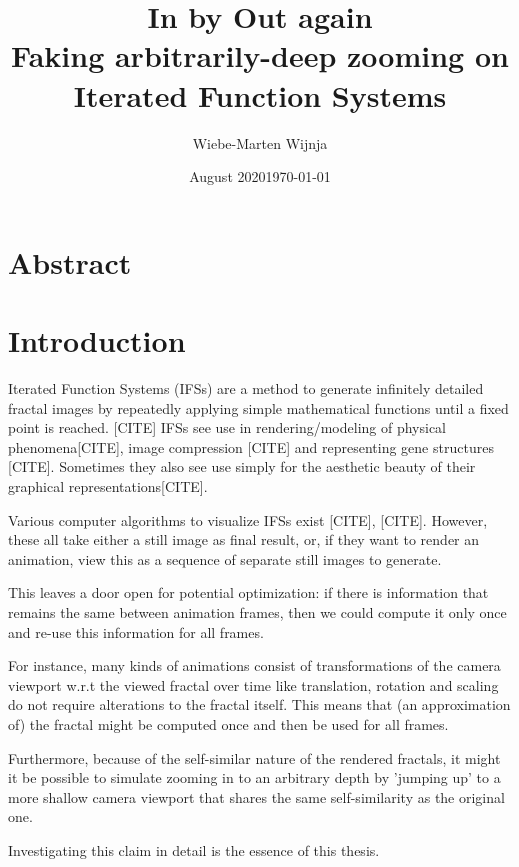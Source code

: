 \documentclass[11pt]{article}
\date{August 2020}
\author{Wiebe-Marten Wijnja}
\date{\today}
\title{\Huge In by Out again\\\medskip
\large Faking arbitrarily-deep zooming on Iterated Function Systems}
\begin{document}
\maketitle
\setcounter{tocdepth}{4}
\tableofcontents

\listoftodos


\section{Abstract}
\label{sec:org6c020a4}


\section{Introduction}
\label{sec:orgaf9ca23}

Iterated Function Systems (IFSs) are a method to generate infinitely detailed fractal images 
by repeatedly applying simple mathematical functions until a fixed point is reached. [CITE]
IFSs see use in rendering/modeling of physical phenomena[CITE], image compression [CITE] and representing gene structures [CITE].
Sometimes they also see use simply for the aesthetic beauty of their graphical representations[CITE].

Various computer algorithms to visualize IFSs exist [CITE], [CITE].
However, these all take either a still image as final result, or, if they want to render an animation,
view this as a sequence of separate still images to generate.

This leaves a door open for potential optimization: if there is information that remains the same between animation frames, 
then we could compute it only once and re-use this information for all frames.

For instance, many kinds of animations consist of transformations of the camera viewport w.r.t the viewed fractal over time like translation, rotation and scaling do not require alterations to the fractal itself.
This means that (an approximation of) the fractal might be computed once and then be used for all frames.

Furthermore, because of the self-similar nature of the rendered fractals,
it might it be possible to simulate zooming in to an arbitrary depth by 'jumping up' to a more shallow camera viewport
that shares the same self-similarity as the original one. 

Investigating this claim in detail is the essence of this thesis.

\end{document}
